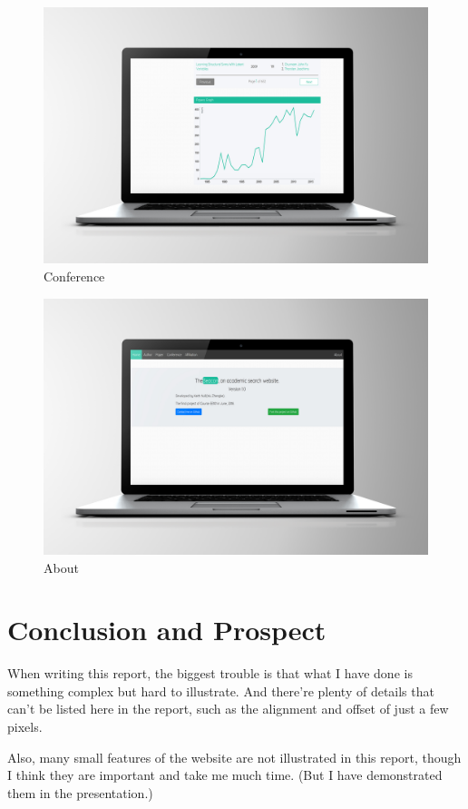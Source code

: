 \documentclass[a4paper]{article}
\begin{document}
                        \begin{figure}[H]
            \centering
            \includegraphics[width=.8\textwidth]{img/img5.jpg}
            \caption{Conference}
            \end{figure}
                        \begin{figure}[H]
            \centering
            \includegraphics[width=.8\textwidth]{img/img1.jpg}
            \caption{About}
            \end{figure}
    \newpage
    \section{Conclusion and Prospect}
When writing this report, the biggest trouble is that what I have done is something complex but hard to illustrate.
And there're plenty of details that can't be listed here in the report, such as the alignment and offset of 
just a few pixels.

Also, many small features of the website are not illustrated in this report, though I think they are important and
take me much time. (But I have demonstrated them in the presentation.)
\end{document}
